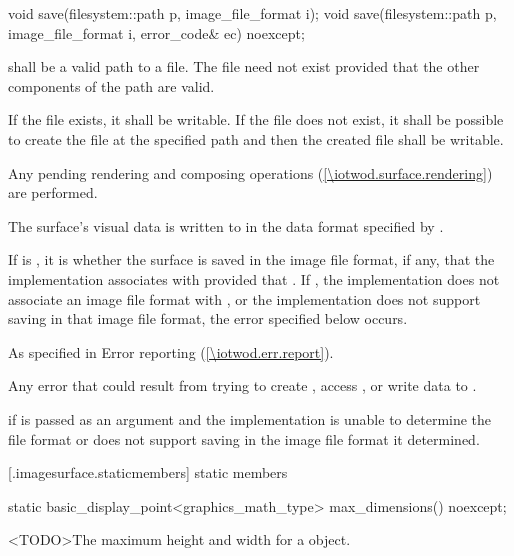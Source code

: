 %
\begin{itemdecl}
void save(filesystem::path p, image_file_format i);
void save(filesystem::path p, image_file_format i, error_code& ec) noexcept;
\end{itemdecl}
\begin{itemdescr}
\pnum
\requires
{} shall be a valid path to a file. The file need not exist provided that the other components of the path are valid.

\pnum
If the file exists, it shall be writable. If the file does not exist, it shall be possible to create the file at the specified path and then the created file shall be writable.

\pnum
\effects
Any pending rendering and composing operations (\ref{\iotwod.surface.rendering}) are performed.

\pnum
The surface's visual data is written to  in the data format specified by .

\pnum
If  is , it is  whether the surface is saved in the image file format, if any, that the implementation associates with  provided that . If , the implementation does not associate an image file format with , or the implementation does not support saving in that image file format, the error specified below occurs.

\pnum
\throws
As specified in Error reporting (\ref{\iotwod.err.report}).

\pnum
\errors
Any error that could result from trying to create , access , or write data to .

\pnum
{} if  is passed as an argument and the implementation is unable to determine the file format or does not support saving in the image file format it determined.
\end{itemdescr}

 [\iotwod.imagesurface.staticmembers] { static members}

%
\begin{itemdecl}
static basic_display_point<graphics_math_type> max_dimensions() noexcept;
\end{itemdecl}
\begin{itemdescr}
\pnum
\returns
<TODO>The maximum height and width for a  object.
\end{itemdescr}


